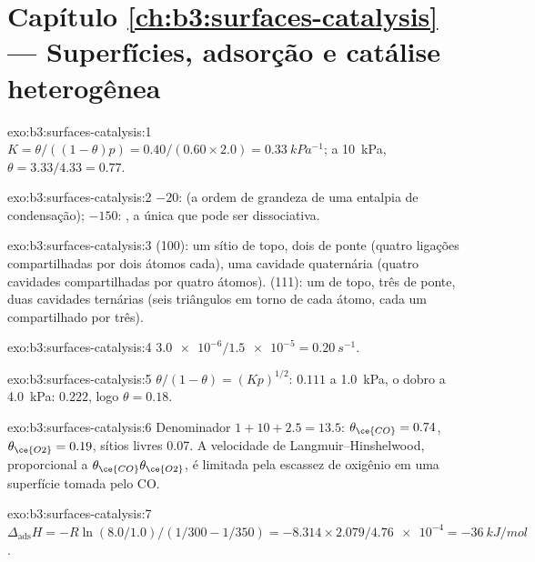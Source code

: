 \section*{Capítulo \ref{ch:b3:surfaces-catalysis} --- Superfícies, adsorção e catálise heterogênea}

\begin{solution}{exo:b3:surfaces-catalysis:1}
$K = \theta/((1 - \theta)p) = 0.40/(0.60 \times 2.0) = \qty{0.33}{kPa^{-1}}$; a \qty{10}{kPa}, $\theta = 3.33/4.33 = 0.77$.
\end{solution}

\begin{solution}{exo:b3:surfaces-catalysis:2}
$-20$:  (a ordem de grandeza de uma entalpia de condensação); $-150$: ,
a única que pode ser dissociativa.
\end{solution}

\begin{solution}{exo:b3:surfaces-catalysis:3}
(100): um sítio de topo, dois de ponte (quatro ligações compartilhadas por dois átomos
cada), uma cavidade quaternária (quatro cavidades compartilhadas por quatro átomos).
(111): um de topo, três de ponte, duas cavidades ternárias (seis triângulos em torno de
cada átomo, cada um compartilhado por três).
\end{solution}

\begin{solution}{exo:b3:surfaces-catalysis:4}
$\num{3.0e-6}/\num{1.5e-5} = \qty{0.20}{s^{-1}}$.
\end{solution}

\begin{solution}{exo:b3:surfaces-catalysis:5}
$\theta/(1 - \theta) = (Kp)^{1/2}$: $0.111$ a \qty{1.0}{kPa}, o dobro a \qty{4.0}{kPa}: $0.222$, logo $\theta = 0.18$.
\end{solution}

\begin{solution}{exo:b3:surfaces-catalysis:6}
Denominador $1 + 10 + 2.5 = 13.5$: $\theta_{\ce{CO}} = 0.74$, $\theta_{\ce{O2}} = 0.19$, sítios livres 0.07. A
velocidade de Langmuir--Hinshelwood, proporcional a $\theta_{\ce{CO}}\theta_{\ce{O2}}$, é limitada pela
escassez de oxigênio em uma superfície tomada pelo CO.
\end{solution}

\begin{solution}{exo:b3:surfaces-catalysis:7}
$\Delta_{\mathrm{ads}}H = -R\ln(8.0/1.0)/(1/300 - 1/350) = -8.314 \times 2.079/\num{4.76e-4} = \qty{-36}{kJ/mol}$.
\end{solution}

